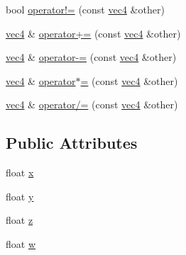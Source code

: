 \begin{DoxyCompactItemize}
\item 
bool \hyperlink{structspork_1_1maths_1_1vec4_ab6b4a7c4ad2ee1ef4afd972053a9bdfc}{operator!=} (const \hyperlink{structspork_1_1maths_1_1vec4}{vec4} \&other)
\item 
\hyperlink{structspork_1_1maths_1_1vec4}{vec4} \& \hyperlink{structspork_1_1maths_1_1vec4_afd668c410bc04ce92ca32c3c958ac50d}{operator+=} (const \hyperlink{structspork_1_1maths_1_1vec4}{vec4} \&other)
\item 
\hyperlink{structspork_1_1maths_1_1vec4}{vec4} \& \hyperlink{structspork_1_1maths_1_1vec4_a922dd7709339bb4c26c63878b762737f}{operator-\/=} (const \hyperlink{structspork_1_1maths_1_1vec4}{vec4} \&other)
\item 
\hyperlink{structspork_1_1maths_1_1vec4}{vec4} \& \hyperlink{structspork_1_1maths_1_1vec4_a6594a80062b4a298e687358c47d9977d}{operator$\ast$=} (const \hyperlink{structspork_1_1maths_1_1vec4}{vec4} \&other)
\item 
\hyperlink{structspork_1_1maths_1_1vec4}{vec4} \& \hyperlink{structspork_1_1maths_1_1vec4_ae774d1b832150880f02e0ca313970589}{operator/=} (const \hyperlink{structspork_1_1maths_1_1vec4}{vec4} \&other)
\end{DoxyCompactItemize}
\subsection*{Public Attributes}
\begin{DoxyCompactItemize}
\item 
float \hyperlink{structspork_1_1maths_1_1vec4_a120e501d2f1b38dac84e612abf78c9ed}{x}
\item 
float \hyperlink{structspork_1_1maths_1_1vec4_a7739a32314dfba099723036cc5b84a98}{y}
\item 
float \hyperlink{structspork_1_1maths_1_1vec4_ab9786e1d7ec46d476a97d29330d568fe}{z}
\item 
float \hyperlink{structspork_1_1maths_1_1vec4_ad8bf830957afe6cdf052c4f1d9d0ca45}{w}
\end{DoxyCompactItemize}
